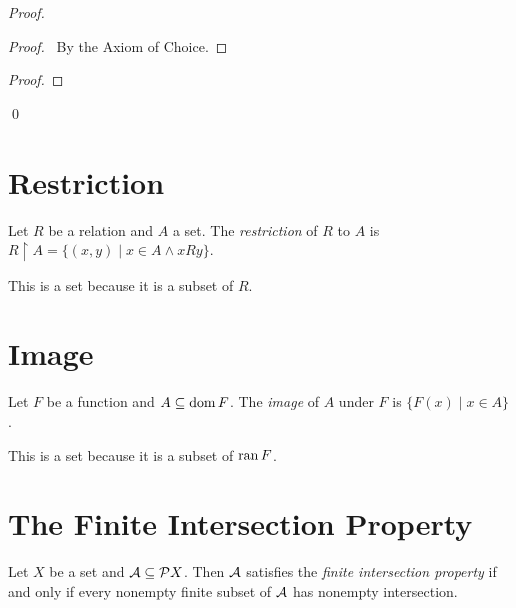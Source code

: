 \begin{proof}
    \pf
    \begin{proof}
        \pf\ By the Axiom of Choice.
    \end{proof}
    \begin{proof}
    \end{proof}
    \qed
\end{proof}

\section{Restriction}

\begin{definition}
    Let $R$ be a relation and $A$ a set. The \emph{restriction} of $R$ to $A$
    is $R \restriction A = \{ (x,y) \mid x \in A \wedge xRy \}$.

    This is a set because it is a subset of $R$.
\end{definition}

\section{Image}

\begin{definition}
    Let $F$ be a function and $A \subseteq \dom F$. The \emph{image} of $A$
    under $F$ is $\{ F(x) \mid x \in A \}$.

    This is a set because it is a subset of $\ran F$.
\end{definition}

\section{The Finite Intersection Property}

\begin{definition}
    Let $X$ be a set and $\AA \subseteq \pow X$. Then $\AA$ satisfies the \emph{finite intersection property} if and only if every nonempty finite subset of $\AA$
    has nonempty intersection.
\end{definition}

